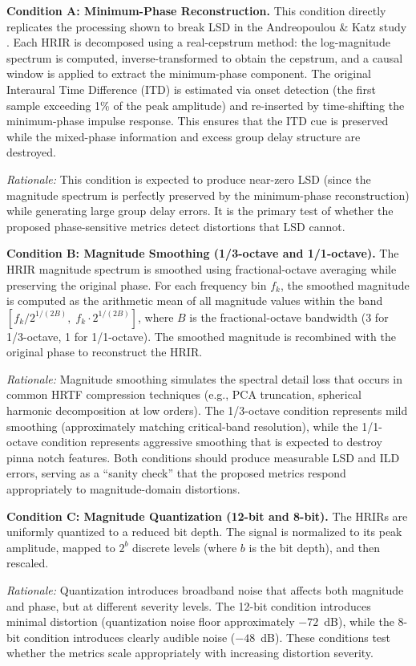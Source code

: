 \documentclass[12pt,a4paper]{article}
\begin{document}
\textbf{Condition A: Minimum-Phase Reconstruction.}
This condition directly replicates the processing shown to break LSD in the Andreopoulou \& Katz study \cite{andreopoulou2022}. Each HRIR is decomposed using a real-cepstrum method: the log-magnitude spectrum is computed, inverse-transformed to obtain the cepstrum, and a causal window is applied to extract the minimum-phase component. The original Interaural Time Difference (ITD) is estimated via onset detection (the first sample exceeding 1\% of the peak amplitude) and re-inserted by time-shifting the minimum-phase impulse response. This ensures that the ITD cue is preserved while the mixed-phase information and excess group delay structure are destroyed.

\textit{Rationale:} This condition is expected to produce near-zero LSD (since the magnitude spectrum is perfectly preserved by the minimum-phase reconstruction) while generating large group delay errors. It is the primary test of whether the proposed phase-sensitive metrics detect distortions that LSD cannot.

\textbf{Condition B: Magnitude Smoothing (1/3-octave and 1/1-octave).}
The HRIR magnitude spectrum is smoothed using fractional-octave averaging while preserving the original phase. For each frequency bin $f_k$, the smoothed magnitude is computed as the arithmetic mean of all magnitude values within the band $[f_k / 2^{1/(2B)},\; f_k \cdot 2^{1/(2B)}]$, where $B$ is the fractional-octave bandwidth (3 for 1/3-octave, 1 for 1/1-octave). The smoothed magnitude is recombined with the original phase to reconstruct the HRIR.

\textit{Rationale:} Magnitude smoothing simulates the spectral detail loss that occurs in common HRTF compression techniques (e.g., PCA truncation, spherical harmonic decomposition at low orders). The 1/3-octave condition represents mild smoothing (approximately matching critical-band resolution), while the 1/1-octave condition represents aggressive smoothing that is expected to destroy pinna notch features. Both conditions should produce measurable LSD and ILD errors, serving as a ``sanity check'' that the proposed metrics respond appropriately to magnitude-domain distortions.

\textbf{Condition C: Magnitude Quantization (12-bit and 8-bit).}
The HRIRs are uniformly quantized to a reduced bit depth. The signal is normalized to its peak amplitude, mapped to $2^b$ discrete levels (where $b$ is the bit depth), and then rescaled.

\textit{Rationale:} Quantization introduces broadband noise that affects both magnitude and phase, but at different severity levels. The 12-bit condition introduces minimal distortion (quantization noise floor approximately $-72$~dB), while the 8-bit condition introduces clearly audible noise ($-48$~dB). These conditions test whether the metrics scale appropriately with increasing distortion severity.
\end{document}

